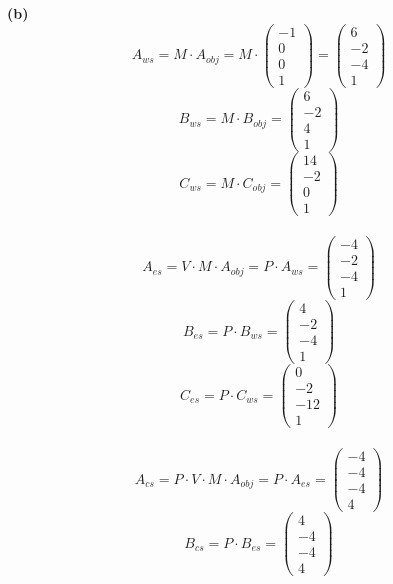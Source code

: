 \documentclass[fleqn]{article}
\begin{document}
\indent\textbf{(b)}
$$A_{ws} = M \cdot A_{obj} = M \cdot \begin{pmatrix} -1 \\ 0 \\ 0 \\ 1 \end{pmatrix} = \begin{pmatrix} 6 \\ -2 \\ -4 \\ 1 \end{pmatrix}$$
$$B_{ws} = M \cdot B_{obj} = \begin{pmatrix} 6 \\ -2 \\ 4 \\ 1 \end{pmatrix}$$
$$C_{ws} = M \cdot C_{obj} = \begin{pmatrix} 14 \\ -2 \\ 0 \\ 1 \end{pmatrix}$$
\\
$$A_{es} = V \cdot M \cdot A_{obj} = P \cdot A_{ws} =  \begin{pmatrix} -4 \\ -2 \\ -4 \\ 1 \end{pmatrix}$$
$$B_{es} = P \cdot B_{ws} =  \begin{pmatrix} 4 \\ -2 \\ -4 \\ 1 \end{pmatrix}$$
$$C_{es} = P \cdot C_{ws} =  \begin{pmatrix} 0 \\ -2 \\ -12 \\ 1 \end{pmatrix}$$
\\
$$A_{cs} = P \cdot V \cdot M \cdot A_{obj} = P \cdot A_{es} = \begin{pmatrix} -4 \\ -4 \\ -4 \\ 4 \end{pmatrix}$$
$$B_{cs} = P \cdot B_{es} = \begin{pmatrix} 4 \\ -4 \\ -4 \\ 4 \end{pmatrix}$$
\end{document}
